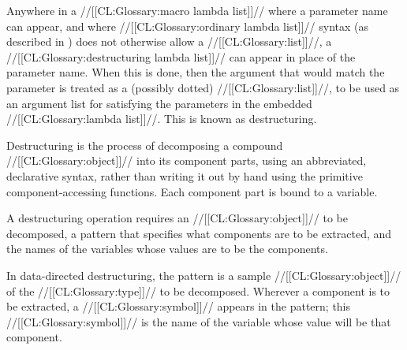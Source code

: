 


Anywhere in a //[[CL:Glossary:macro lambda list]]// where a parameter
name can appear, and where //[[CL:Glossary:ordinary lambda list]]// syntax
(as described in \secref\OrdinaryLambdaLists) does not 
otherwise allow a //[[CL:Glossary:list]]//, a //[[CL:Glossary:destructuring lambda list]]// 
can appear in place
of the parameter name.  When this is done, then the argument 
that would match the parameter is treated as a (possibly dotted) //[[CL:Glossary:list]]//,
to be used as an argument list for satisfying the
parameters in the embedded //[[CL:Glossary:lambda list]]//.
This is known as destructuring.
 








Destructuring is the process of decomposing a compound //[[CL:Glossary:object]]// into
its component parts, using an abbreviated, declarative syntax, rather
than writing it out by hand using the primitive component-accessing
functions.  Each component part is bound to a variable.





 




















 




 
A destructuring operation requires an //[[CL:Glossary:object]]// to be decomposed, 
a pattern that specifies what components are to be extracted, and the names
of the variables whose values are to be the components.





 

In data-directed destructuring,
the pattern is a sample //[[CL:Glossary:object]]// of the //[[CL:Glossary:type]]// to be decomposed.
Wherever a component is to be extracted, 
a //[[CL:Glossary:symbol]]// appears in the pattern; 
this //[[CL:Glossary:symbol]]// is the name of the variable whose value will be that component.












